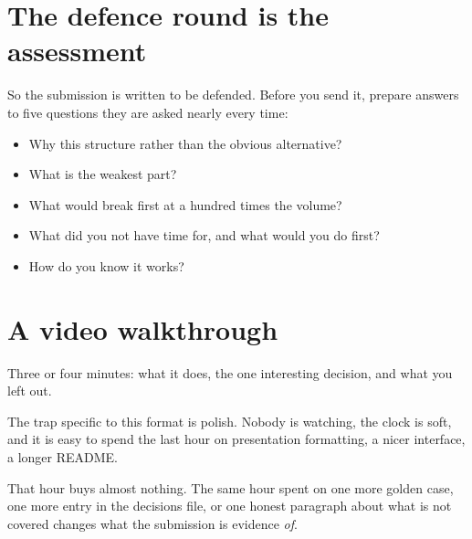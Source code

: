 \section{The defence round is the assessment}


So the submission is written to be defended. Before you send it, prepare
answers to five questions \dash{} they are asked nearly every time:

\begin{itemize}
  \item Why this structure rather than the obvious alternative?
  \item What is the weakest part?
  \item What would break first at a hundred times the volume?
  \item What did you not have time for, and what would you do first?
  \item How do you know it works?
\end{itemize}


\section{A video walkthrough}


Three or four minutes: what it does, the one interesting decision, and what you
left out. 

\begin{kittrap}
The trap specific to this format is polish. Nobody is watching, the clock is
soft, and it is easy to spend the last hour on presentation \dash{} formatting,
a nicer interface, a longer README.

That hour buys almost nothing. The same hour spent on one more golden case, one
more entry in the decisions file, or one honest paragraph about what is not
covered changes what the submission is evidence \emph{of}.
\end{kittrap}

